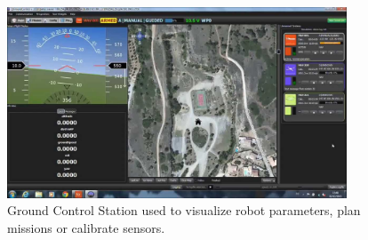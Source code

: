 \begin{figure}[H]
 \centering
 \includegraphics[width=0.9\textwidth]{groundcontrol.jpg}
 \caption[Ground Control Station]{Ground Control Station used to visualize robot parameters, plan missions or calibrate sensors.}
 \label{figure:controlstation}
\end{figure}


